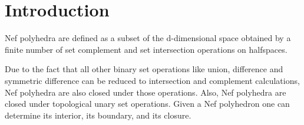 \ccParDims

\label{chapterNef_S2}

\minitoc

\section{Introduction}

Nef polyhedra are defined as a subset of the d-dimensional space obtained by
a finite number of set complement and set intersection operations on
halfspaces. 

Due to the fact that all other binary set operations like union,
difference and symmetric difference can be reduced to intersection and
complement calculations, Nef polyhedra are also closed under those
operations. Also, Nef polyhedra are closed under topological unary 
set operations. Given a Nef polyhedron one can determine its interior, its
boundary, and its closure.

